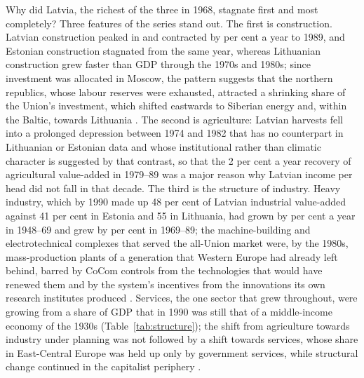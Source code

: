 Why did Latvia, the richest of the three in 1968, stagnate first and most completely? Three features of the series stand out. The first is construction. Latvian construction peaked in  and contracted by  per cent a year to 1989, and Estonian construction stagnated from the same year, whereas Lithuanian construction grew faster than GDP through the 1970s and 1980s; since investment was allocated in Moscow, the pattern suggests that the northern republics, whose labour reserves were exhausted, attracted a shrinking share of the Union's investment, which shifted eastwards to Siberian energy \parencites[2, 4]{ciasovietrep1970}[323]{craftstoniolo2010} and, within the Baltic, towards Lithuania \parencite[492--3]{grybkauskas_2022_economic}. The second is agriculture: Latvian harvests fell into a prolonged depression between 1974 and 1982 that has no counterpart in Lithuanian or Estonian data and whose institutional rather than climatic character is suggested by that contrast, so that the 2 per cent a year recovery of agricultural value-added in 1979--89 was a major reason why Latvian income per head did not fall in that decade. The third is the structure of industry. Heavy industry, which by 1990 made up 48 per cent of Latvian industrial value-added against 41 per cent in Estonia and 55 in Lithuania, had grown by  per cent a year in 1948--69 and grew by  per cent in 1969--89; the machine-building and electrotechnical complexes that served the all-Union market were, by the 1980s, mass-production plants of a generation that Western Europe had already left behind, barred by CoCom controls from the technologies that would have renewed them and by the system's incentives from the innovations its own research institutes produced \parencites[49]{broadberryklein2011}[315, 323]{craftstoniolo2010}. Services, the one sector that grew throughout, were growing from a share of GDP that in 1990 was still that of a middle-income economy of the 1930s (Table~\ref{tab:structure}); the shift from agriculture towards industry under planning was not followed by a shift towards services, whose share in East-Central Europe was held up only by government services, while structural change continued in the capitalist periphery \parencite[285--6]{vonyoinmorys2021}.

